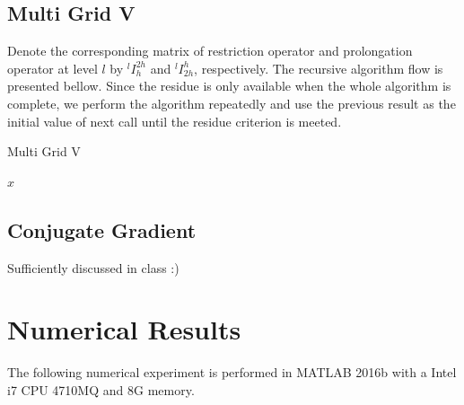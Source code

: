 \documentclass[12pt]{article}
\begin{document}
\subsection{Multi Grid V}
Denote the corresponding matrix of restriction operator and prolongation operator at level $l$ by ${}^{l}I_{h}^{2h}$ and ${}^lI_{2h}^h$, respectively. The recursive algorithm flow is presented bellow. Since the residue is only available when the whole algorithm is complete, we perform the algorithm repeatedly and use the previous result as the initial value of next call until the residue criterion is meeted.
\begin{algorithm}[!htb]
  \caption{Multi Grid V}
  \label{alg:MG}  
  \Return $x$\;
\end{algorithm}
\subsection{Conjugate Gradient}
Sufficiently discussed in class :)
\section{Numerical Results}
The following numerical experiment is performed in MATLAB 2016b with a Intel i7 CPU 4710MQ and 8G memory.
\end{document}
